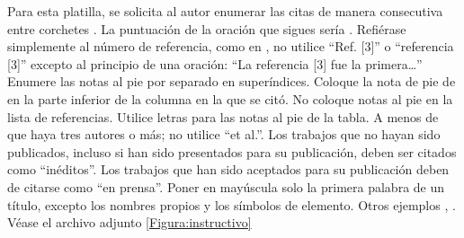 Para esta platilla, se solicita al autor enumerar las citas de manera consecutiva entre corchetes \cite{YLi2013}. 
La puntuación de la oración que sigues sería \cite{Mesaelides2011}. 
Refiérase simplemente al número de referencia, como en \cite{Morales2012}, no utilice “Ref. [3]” o “referencia [3]” excepto al principio de una oración: “La referencia [3] fue la primera…”
Enumere las notas al pie por separado en superíndices. Coloque la nota de pie de en la parte inferior de la columna en la que se citó. No coloque notas al pie en la lista de referencias. Utilice letras para las notas al pie de la tabla.
A menos de que haya tres autores o más; no utilice “et al.”. Los trabajos que no hayan sido publicados, incluso si han sido presentados para su publicación, deben ser citados como “inéditos”. Los trabajos que han sido aceptados para su publicación deben de citarse como “en prensa”. Poner en mayúscula solo la primera palabra de un título, excepto los nombres propios y los símbolos de elemento. 
Otros ejemplos \cite{LAAngeles2021}, \cite{LAAngelesConni}. 
Véase el archivo adjunto \ref{Figura:instructivo}


% 
% 
% 
% 
\appendix
% 
\label{Figura:instructivo}

% 
\label{Figura:Materiales}

% 
\label{Figura:Hoja de datos}



\newpage


